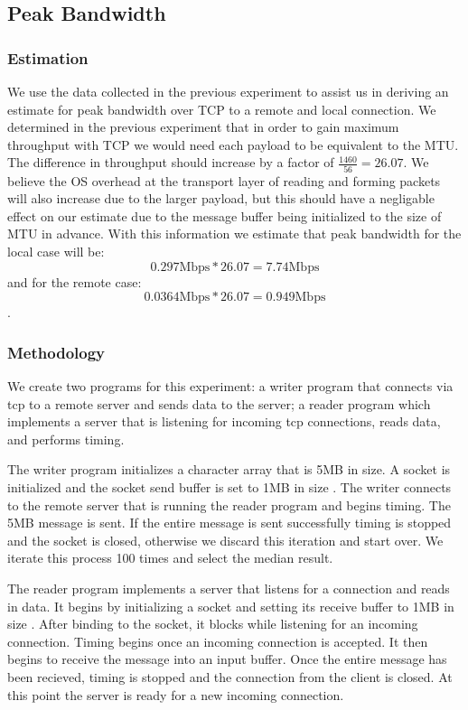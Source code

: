 \subsection{Peak Bandwidth}

\subsubsection{Estimation}

We use the data collected in the previous experiment to assist us in
deriving an estimate for peak bandwidth over TCP to a remote and local
connection. We determined in the previous experiment that in order to 
gain maximum throughput with TCP we would need each payload to be 
equivalent to the MTU. The difference in throughput should increase 
by a factor of $\frac{1460}{56} = 26.07$. We believe the OS overhead at the transport 
layer of reading and forming packets will also increase due to the larger payload, but 
this should have a negligable effect on our estimate due to the message buffer being 
initialized to the size of MTU in advance. With this information we estimate that 
peak bandwidth for the local case will be: $$0.297\text{Mbps} * 26.07 = 7.74\text{Mbps}$$
and for the remote case: $$0.0364\text{Mbps} * 26.07 = 0.949\text{Mbps}$$.

\subsubsection{Methodology}

We create two programs for this experiment: a writer program that connects via
tcp to a remote server and sends data to the server; a reader program which
implements a server that is listening for incoming tcp connections, reads data,
and performs timing.

The writer program initializes a character array that is 5MB in size. 
A socket is initialized and the socket send buffer is set to 1MB in size \cite{lmbench}. 
The writer connects to the remote server that is running the reader program and begins timing. 
The 5MB message is sent. If the entire message is sent successfully timing is stopped and 
the socket is closed, otherwise we discard this iteration and start over. 
We iterate this process 100 times and select the median result.

The reader program implements a server that listens for a connection and reads in data.
It begins by initializing a socket and setting its receive buffer to 1MB in size \cite{lmbench}.
After binding to the socket, it blocks while listening for an incoming connection. Timing begins
once an incoming connection is accepted. It then begins to receive the message into an input buffer.
Once the entire message has been recieved, timing is stopped and the connection from the client is
closed. At this point the server is ready for a new incoming connection.

